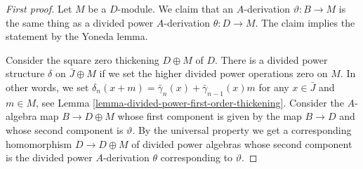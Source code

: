 \documentclass{stacks-project}
\theoremstyle{plain}
\theoremstyle{definition}
\theoremstyle{remark}
\numberwithin{equation}{subsection}
\begin{document}
\begin{proof}[First proof]
Let $M$ be a $D$-module. We claim that an $A$-derivation
$\vartheta : B \to M$ is the same thing as a divided power
$A$-derivation $\theta : D \to M$. The claim implies the
statement by the Yoneda lemma.

\medskip\noindent
Consider the square zero thickening $D \oplus M$ of $D$.
There is a divided power structure $\delta$ on $\bar J \oplus M$
if we set the higher divided power operations zero on $M$.
In other words, we set
$\delta_n(x + m) = \bar\gamma_n(x) + \bar\gamma_{n - 1}(x)m$ for
any $x \in \bar J$ and $m \in M$, see
Lemma \ref{lemma-divided-power-first-order-thickening}.
Consider the $A$-algebra map $B \to D \oplus M$ whose first
component is given by the map $B \to D$ and whose second component
is $\vartheta$. By the universal property we get a corresponding
homomorphism $D \to D \oplus M$ of divided power algebras
whose second component is the divided power
$A$-derivation $\theta$ corresponding to $\vartheta$.
\end{proof}
\end{document}
